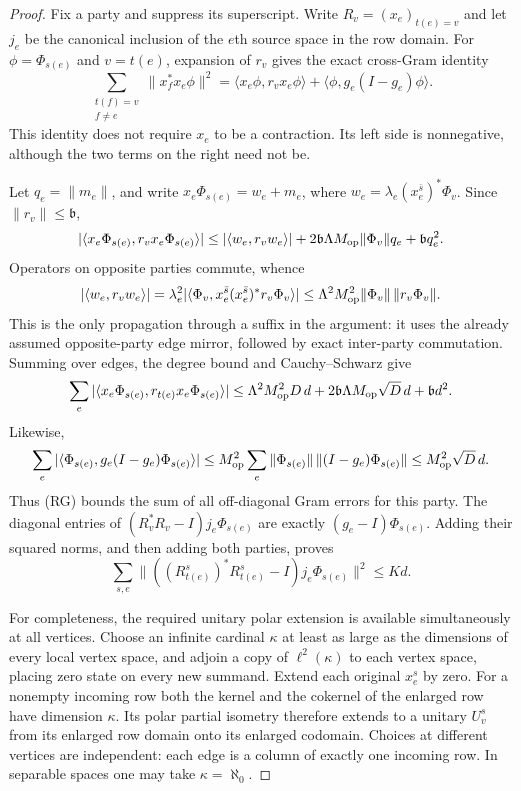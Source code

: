 \begin{proof}
Fix a party and suppress its superscript. Write $R_v=(x_e)_{t(e)=v}$ and let $j_e$ be the canonical inclusion of the $e$th source space in the row domain. For $\phi=\Phi_{s(e)}$ and $v=t(e)$, expansion of $r_v$ gives the exact cross-Gram identity
\[
 \sum_{\substack{t(f)=v\\f\ne e}}\|x_f^*x_e\phi\|^2
 =\langle x_e\phi,r_vx_e\phi\rangle+
 \langle\phi,g_e(I-g_e)\phi\rangle.
 \tag{RG}
\]
This identity does not require $x_e$ to be a contraction. Its left side is nonnegative, although the two terms on the right need not be.

Let $q_e=\|m_e\|$, and write $x_e\Phi_{s(e)}=w_e+m_e$, where $w_e=\lambda_e(x_e^{\bar s})^*\Phi_v$. Since $\|r_v\|\le\mathfrak b$,
\[
 |\langle x_e\Phi_{s(e)},r_vx_e\Phi_{s(e)}\rangle|
 \le |\langle w_e,r_vw_e\rangle|+2\mathfrak b\Lambda M_{\rm op}\|\Phi_v\|q_e+\mathfrak b q_e^2.
\]
Operators on opposite parties commute, whence
\[
 |\langle w_e,r_vw_e\rangle|
 =\lambda_e^2|\langle\Phi_v,x_e^{\bar s}(x_e^{\bar s})^*r_v\Phi_v\rangle|
 \le\Lambda^2M_{\rm op}^2\|\Phi_v\|\,\|r_v\Phi_v\|.
\]
This is the only propagation through a suffix in the argument: it uses the already assumed opposite-party edge mirror, followed by exact inter-party commutation. Summing over edges, the degree bound and Cauchy--Schwarz give
\[
 \sum_e|\langle x_e\Phi_{s(e)},r_{t(e)}x_e\Phi_{s(e)}\rangle|
 \le \Lambda^2M_{\rm op}^2D\,d+2\mathfrak b\Lambda M_{\rm op}\sqrt D\,d+\mathfrak b d^2.
\]
Likewise,
\[
 \sum_e|\langle\Phi_{s(e)},g_e(I-g_e)\Phi_{s(e)}\rangle|
 \le M_{\rm op}^2\sum_e\|\Phi_{s(e)}\|\,\|(I-g_e)\Phi_{s(e)}\|
 \le M_{\rm op}^2\sqrt D\,d.
\]
Thus (RG) bounds the sum of all off-diagonal Gram errors for this party. The diagonal entries of $(R_v^*R_v-I)j_e\Phi_{s(e)}$ are exactly $(g_e-I)\Phi_{s(e)}$. Adding their squared norms, and then adding both parties, proves
\[
 \sum_{s,e}\|((R_{t(e)}^s)^*R_{t(e)}^s-I)j_e\Phi_{s(e)}\|^2\le Kd.
 \tag{GG}
\]

For completeness, the required unitary polar extension is available simultaneously at all vertices. Choose an infinite cardinal $\kappa$ at least as large as the dimensions of every local vertex space, and adjoin a copy of $\ell^2(\kappa)$ to each vertex space, placing zero state on every new summand. Extend each original $x_e^s$ by zero. For a nonempty incoming row both the kernel and the cokernel of the enlarged row have dimension $\kappa$. Its polar partial isometry therefore extends to a unitary $U_v^s$ from its enlarged row domain onto its enlarged codomain. Choices at different vertices are independent: each edge is a column of exactly one incoming row. In separable spaces one may take $\kappa=\aleph_0$.


\end{proof}
